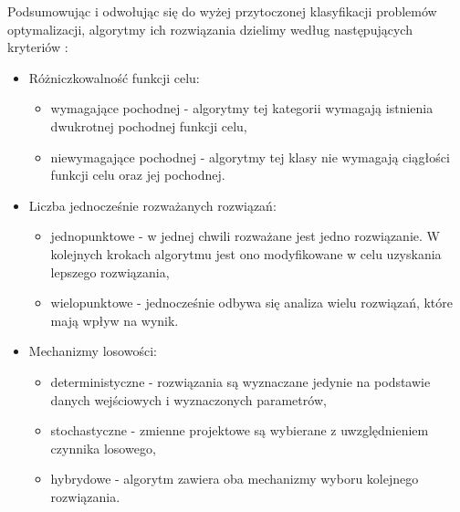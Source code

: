 Podsumowując i odwołując się do wyżej przytoczonej klasyfikacji problemów optymalizacji, algorytmy ich rozwiązania  dzielimy według następujących kryteriów \cite{Tesch2016}:
\begin{itemize}
	\item Różniczkowalność funkcji celu:
	\begin{itemize}
		\item wymagające pochodnej - algorytmy tej kategorii wymagają istnienia dwukrotnej pochodnej funkcji celu,
		\item niewymagające pochodnej - algorytmy tej klasy nie wymagają ciągłości funkcji celu oraz jej pochodnej.
	\end{itemize}
	\item Liczba jednocześnie rozważanych rozwiązań:
	\begin{itemize}
		\item jednopunktowe - w jednej chwili rozważane jest jedno rozwiązanie. W kolejnych krokach algorytmu jest ono modyfikowane w celu uzyskania lepszego rozwiązania,
		\item wielopunktowe - jednocześnie odbywa się analiza wielu rozwiązań, które mają wpływ na wynik.
	\end{itemize}
	\item Mechanizmy losowości:
	\begin{itemize}
		\item deterministyczne - rozwiązania są wyznaczane jedynie na podstawie danych wejściowych i wyznaczonych parametrów,
		\item stochastyczne - zmienne projektowe są wybierane z uwzględnieniem czynnika losowego,
		\item hybrydowe - algorytm zawiera oba mechanizmy wyboru kolejnego rozwiązania.
	\end{itemize}
\end{itemize}


